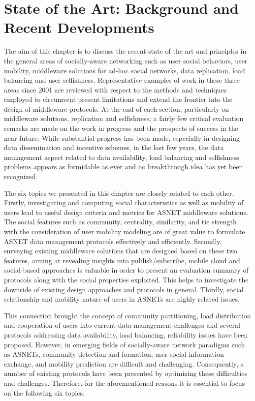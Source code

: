 \chapter{State of the Art: Background and Recent Developments}\label{Chap2}

The aim of this chapter is to discuss the recent state of the art and principles in the general areas of socially-aware networking such as user social behaviors, user mobility, middleware solutions for ad-hoc social networks, data replication, load balancing and user selfishness. Representative examples of work in these three areas since 2001 are reviewed with respect to the methods and techniques employed to circumvent present limitations and extend the frontier into the design of middleware protocols. At the end of each section, particularly on middleware solutions, replication and selfishness; a fairly few critical evaluation remarks are made on the work in progress and the prospects of success in the near future. While substantial progress has been made, especially in designing data dissemination and incentive schemes, in the last few years, the data management aspect related to data availability, load balancing and selfishness problems appears as formidable as ever and no breakthrough idea has yet been recognized.

The six topics we presented in this chapter are closely related to each other. Firstly, investigating and computing social characteristics as well as mobility of users lead to useful design criteria and metrics for ASNET middleware solutions. The social features such as community, centrality, similarity, and tie strength with the consideration of user mobility modeling are of great value to formulate ASNET data management protocols effectively and efficiently. Secondly, surveying existing middleware solutions that are designed based on these two features, aiming at revealing insights into publish/subscribe, mobile cloud and social-based approaches is valuable in order to present an evaluation summary of protocols along with the social properties exploited. This helps to investigate the downside of existing design approaches and protocols in general.  Thirdly, social relationship and mobility nature of users in ASNETs are highly related issues.

This connection brought the concept of community partitioning, load distribution and cooperation of users into current data management challenges and several protocols addressing data availability, load balancing, reliability issues have been proposed.  However, in emerging fields of socially-aware network paradigms such as ASNETs, community detection and formation, user social information exchange, and mobility prediction are difficult and challenging. Consequently, a number of existing protocols have been presented by optimizing these difficulties and challenges. Therefore, for the aforementioned reasons it is essential to focus on the following six topics.

